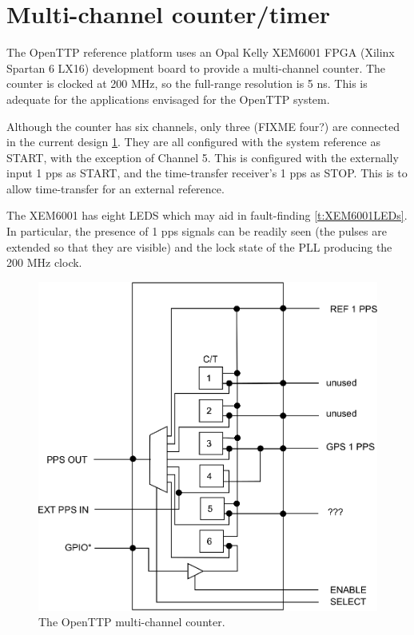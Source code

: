 
\section{Multi-channel counter/timer}

The OpenTTP reference platform uses an Opal Kelly XEM6001 FPGA (Xilinx Spartan 6 LX16) development board to provide a multi-channel counter.
The counter is clocked at 200 MHz, so the full-range resolution is 5 ns. 
This is adequate for the applications envisaged for the OpenTTP system.

Although the counter has six channels, only three (FIXME four?) are connected in the current design \ref{f:counter}.
They are all configured with the system reference as START, with the exception of Channel 5.
This is configured with the externally input 1 pps as START, and the time-transfer receiver's 1 pps as STOP.
This is to allow time-transfer for an external reference.

The XEM6001 has eight LEDS which may aid in fault-finding \ref{t:XEM6001LEDs}. In particular, the presence of 1 pps signals 
can be readily seen (the pulses are extended so that they are visible) and the lock state of the PLL producing the 200 MHz clock.

\begin{figure}
\centerline{\includegraphics{figures/ottpcounter.eps}}
\caption{The OpenTTP multi-channel counter. \label{f:counter}}
\end{figure}

